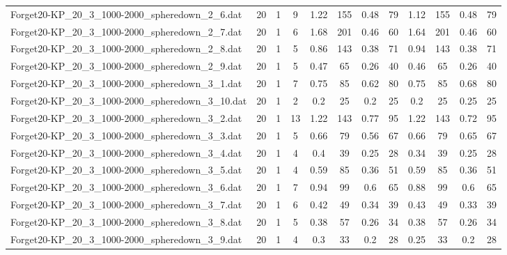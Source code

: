 \begin{sidewaystable}[!ht]
{\begin{tabular}{lccccccccccc}
Forget20-KP\_20\_3\_1000-2000\_spheredown\_2\_6.dat & 20 & 1 & 9 & 1.22 & 155 & 0.48 & 79 & 1.12 & 155 & 0.48 & 79 \\
Forget20-KP\_20\_3\_1000-2000\_spheredown\_2\_7.dat & 20 & 1 & 6 & 1.68 & 201 &  \textcolor{blue2}{0.46} & 60 & 1.64 & 201 &  \textcolor{blue2}{0.46} & 60 \\
Forget20-KP\_20\_3\_1000-2000\_spheredown\_2\_8.dat & 20 & 1 & 5 & 0.86 & 143 &  \textcolor{blue2}{0.38} & 71 & 0.94 & 143 &  \textcolor{blue2}{0.38} & 71 \\
Forget20-KP\_20\_3\_1000-2000\_spheredown\_2\_9.dat & 20 & 1 & 5 & 0.47 & 65 &  \textcolor{blue2}{0.26} & 40 & 0.46 & 65 &  \textcolor{blue2}{0.26} & 40 \\
Forget20-KP\_20\_3\_1000-2000\_spheredown\_3\_1.dat & 20 & 1 & 7 & 0.75 & 85 &  \textcolor{blue2}{0.62} & 80 & 0.75 & 85 & 0.68 & 80 \\
Forget20-KP\_20\_3\_1000-2000\_spheredown\_3\_10.dat & 20 & 1 & 2 &  \textcolor{blue2}{0.2} & 25 &  \textcolor{blue2}{0.2} & 25 &  \textcolor{blue2}{0.2} & 25 & 0.25 & 25 \\
Forget20-KP\_20\_3\_1000-2000\_spheredown\_3\_2.dat & 20 & 1 & 13 & 1.22 & 143 & 0.77 & 95 & 1.22 & 143 &  \textcolor{blue2}{0.72} & 95 \\
Forget20-KP\_20\_3\_1000-2000\_spheredown\_3\_3.dat & 20 & 1 & 5 & 0.66 & 79 &  \textcolor{blue2}{0.56} & 67 & 0.66 & 79 & 0.65 & 67 \\
Forget20-KP\_20\_3\_1000-2000\_spheredown\_3\_4.dat & 20 & 1 & 4 & 0.4 & 39 &  \textcolor{blue2}{0.25} & 28 & 0.34 & 39 &  \textcolor{blue2}{0.25} & 28 \\
Forget20-KP\_20\_3\_1000-2000\_spheredown\_3\_5.dat & 20 & 1 & 4 & 0.59 & 85 &  \textcolor{blue2}{0.36} & 51 & 0.59 & 85 &  \textcolor{blue2}{0.36} & 51 \\
Forget20-KP\_20\_3\_1000-2000\_spheredown\_3\_6.dat & 20 & 1 & 7 & 0.94 & 99 &  \textcolor{blue2}{0.6} & 65 & 0.88 & 99 &  \textcolor{blue2}{0.6} & 65 \\
Forget20-KP\_20\_3\_1000-2000\_spheredown\_3\_7.dat & 20 & 1 & 6 & 0.42 & 49 & 0.34 & 39 & 0.43 & 49 &  \textcolor{blue2}{0.33} & 39 \\
Forget20-KP\_20\_3\_1000-2000\_spheredown\_3\_8.dat & 20 & 1 & 5 & 0.38 & 57 &  \textcolor{blue2}{0.26} & 34 & 0.38 & 57 &  \textcolor{blue2}{0.26} & 34 \\
Forget20-KP\_20\_3\_1000-2000\_spheredown\_3\_9.dat & 20 & 1 & 4 & 0.3 & 33 &  \textcolor{blue2}{0.2} & 28 & 0.25 & 33 &  \textcolor{blue2}{0.2} & 28 \\

\end{tabular}}
\end{sidewaystable}
